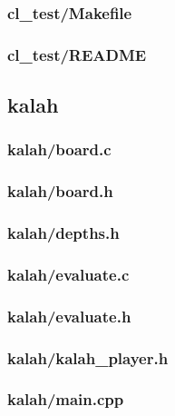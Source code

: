 \documentclass{article}
\begin{document}
\subsubsection*{cl\_test/Makefile}


\subsubsection*{cl\_test/README}


\subsection*{kalah}
\subsubsection*{kalah/board.c}


\subsubsection*{kalah/board.h}


\subsubsection*{kalah/depths.h}


\subsubsection*{kalah/evaluate.c}


\subsubsection*{kalah/evaluate.h}


\subsubsection*{kalah/kalah\_player.h}


\subsubsection*{kalah/main.cpp}

\end{document}
